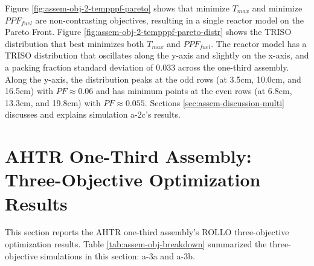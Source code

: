 Figure \ref{fig:assem-obj-2-tempppf-pareto} shows that minimize $T_{max}$ and minimize 
$PPF_{fuel}$ are non-contrasting objectives, resulting in a single reactor model on the 
Pareto Front. 
Figure \ref{fig:assem-obj-2-tempppf-pareto-distr} shows the TRISO distribution that best 
minimizes both $T_{max}$ and $PPF_{fuel}$. 
The reactor model has a TRISO distribution that oscillates along the y-axis and 
slightly on the x-axis, and a packing fraction standard deviation of $0.033$ 
across the one-third assembly. 
Along the y-axis, the distribution peaks at the odd rows (at 3.5cm, 10.0cm, and 16.5cm) 
with $PF\approx0.06$ and has minimum points at the even rows (at 6.8cm, 13.3cm, and 
19.8cm) with $PF\approx0.055$.
Sections \ref{sec:assem-discussion-multi} discusses and explains simulation a-2c's 
results.

\section{AHTR One-Third Assembly: Three-Objective Optimization Results}
\label{sec:assem-three-obj}
This section reports the \gls{AHTR} one-third assembly's \gls{ROLLO} three-objective 
optimization results. 
Table \ref{tab:assem-obj-breakdown} summarized the three-objective simulations in this 
section: a-3a and a-3b. 

